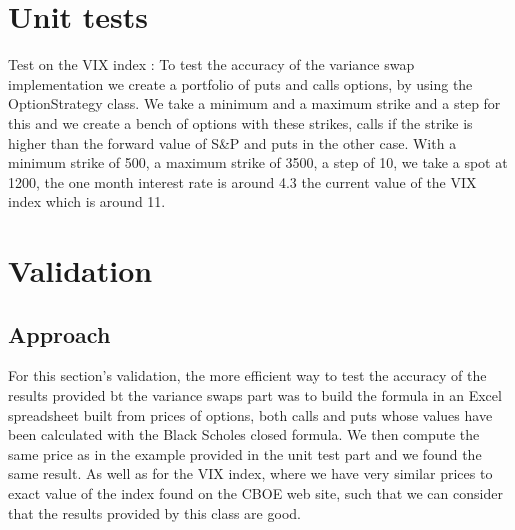 \section{Unit tests}

Test on the VIX index : To test the accuracy of the variance swap implementation 
we create a portfolio of puts and calls options, by using the OptionStrategy class. 
We take a minimum and a maximum strike and a step for this and we create a bench of options 
with these strikes, calls if the strike is higher than the forward value of S\&P and puts in the other case. 
With a minimum strike of 500, a maximum strike of 3500, a step of 10, we take a spot at 1200, the one month 
interest rate is around 4.3%
the current value of the VIX index which is around 11.




\section{Validation}


\subsection{Approach}

For this section's validation, the more efficient way to test the accuracy of the results provided bt 
the variance swaps part was to build the formula in an Excel spreadsheet built from prices of options, 
both calls and puts whose values have been calculated with the Black Scholes closed formula. We then compute 
the same price as in the example provided in the unit test part and we found the same result.
As well as for the VIX index, where we have very similar prices to exact value of the index found 
on the CBOE web site, such that we can consider that the results provided by this class are good.
